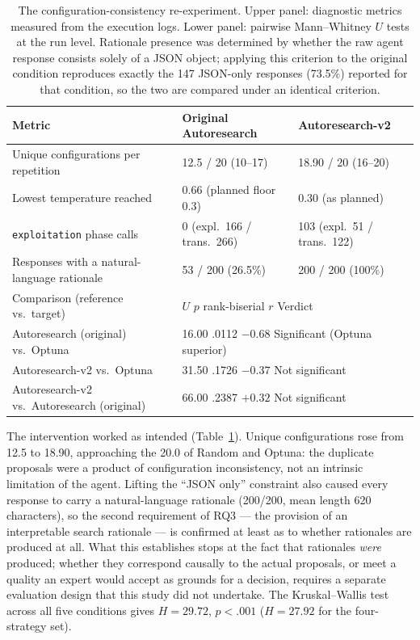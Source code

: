 \begin{table}[t]
\centering
\caption{The configuration-consistency re-experiment. Upper panel: diagnostic
metrics measured from the execution logs. Lower panel: pairwise Mann--Whitney $U$
tests at the run level. Rationale presence was determined by whether the raw
agent response consists solely of a JSON object; applying this criterion to the
original condition reproduces exactly the 147 JSON-only responses (73.5\%)
reported for that condition, so the two are compared under an identical
criterion.}
\label{tab:v2}
\small
\begin{tabular}{@{}lll@{}}
\toprule
Metric & Original Autoresearch & Autoresearch-v2 \\
\midrule
Unique configurations per repetition & 12.5 / 20 (10--17) & 18.90 / 20 (16--20) \\
Lowest temperature reached & 0.66 (planned floor 0.3) & 0.30 (as planned) \\
\texttt{exploitation} phase calls & 0 (expl.\ 166 / trans.\ 266) & 103 (expl.\ 51 / trans.\ 122) \\
Responses with a natural-language rationale & 53 / 200 (26.5\%) & 200 / 200 (100\%) \\
\midrule
Comparison (reference vs.\ target) & \multicolumn{2}{l}{$U$ \quad $p$ \quad rank-biserial $r$ \quad Verdict} \\
\midrule
Autoresearch (original) vs.\ Optuna & \multicolumn{2}{l}{16.00 \quad .0112 \quad $-0.68$ \quad Significant (Optuna superior)} \\
Autoresearch-v2 vs.\ Optuna & \multicolumn{2}{l}{31.50 \quad .1726 \quad $-0.37$ \quad Not significant} \\
Autoresearch-v2 vs.\ Autoresearch (original) & \multicolumn{2}{l}{66.00 \quad .2387 \quad $+0.32$ \quad Not significant} \\
\bottomrule
\end{tabular}
\end{table}

The intervention worked as intended (Table~\ref{tab:v2}). Unique configurations
rose from 12.5 to 18.90, approaching the 20.0 of Random and Optuna: the duplicate
proposals were a product of configuration inconsistency, not an intrinsic
limitation of the agent. Lifting the ``JSON only'' constraint also caused every
response to carry a natural-language rationale (200/200, mean length 620
characters), so the second requirement of RQ3 --- the provision of an
interpretable search rationale --- is confirmed at least as to whether rationales
are produced at all. What this establishes stops at the fact that rationales
\emph{were} produced; whether they correspond causally to the actual proposals, or
meet a quality an expert would accept as grounds for a decision, requires a
separate evaluation design that this study did not undertake. The
Kruskal--Wallis test across all five conditions gives $H = 29.72$, $p < .001$
($H = 27.92$ for the four-strategy set).

